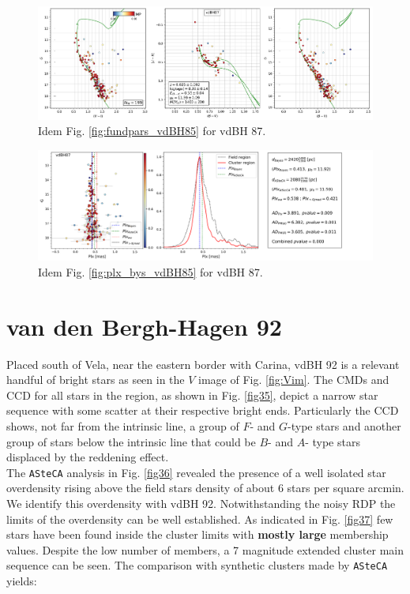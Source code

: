 \documentclass[referee]{aa}
\begin{document}
\begin{figure}[ht]
    \centering
    \includegraphics[width=\hsize]{../figs/cmds_vdbh87.png}
    \caption{Idem Fig. \ref{fig:fundpars_vdBH85} for vdBH 87.}
    \label{fig17}
\end{figure}
\begin{figure}[ht]
    \centering
    \includegraphics[width=\hsize]{../figs/plx_vdBH87.png}
    \caption{Idem Fig. \ref{fig:plx_bys_vdBH85} for vdBH 87.}
    \label{fig18}
\end{figure}




\section{van den Bergh-Hagen 92}

Placed south of Vela, near the eastern border with Carina, vdBH
92 is a relevant handful of bright stars as seen in the $V$ image of Fig.
\ref{fig:Vim}. The CMDs and CCD for all stars in the region, as shown in Fig.
\ref{fig35}, depict a narrow star sequence with some scatter at their respective
bright ends. Particularly the CCD shows, not far from the intrinsic line, a
group of $F$- and $G$-type stars and another group of stars below the intrinsic
line that could be $B$- and $A$- type stars displaced by the reddening effect.\\

The \texttt{ASteCA} analysis in Fig. \ref{fig36} revealed the presence of a
well isolated star overdensity rising above the field stars density of about 6
stars per square arcmin. We identify this overdensity with vdBH
92. Notwithstanding the noisy RDP the limits of the overdensity can be well
established. As indicated in Fig. \ref{fig37} few stars have been found inside
the cluster limits with \textbf{mostly large} membership values. Despite the
low number of members, a 7 magnitude extended cluster main sequence can be
seen. The comparison with synthetic clusters made by \texttt{ASteCA} yields:
\end{document}
